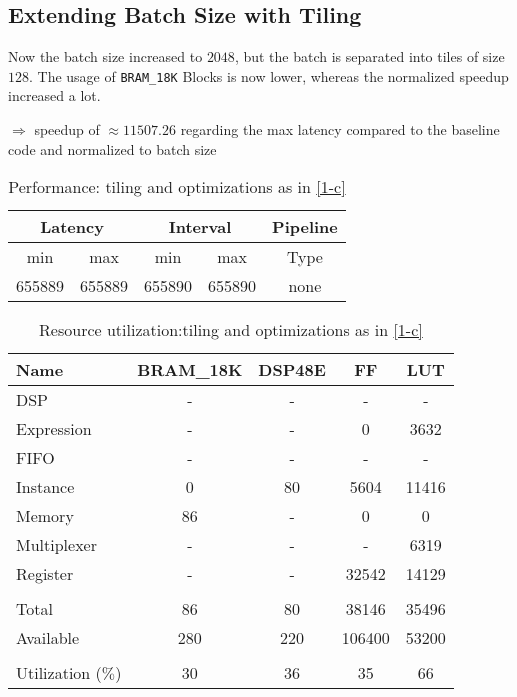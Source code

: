 \documentclass[../main.tex]{subfiles}
\begin{document}
\subsection{Extending Batch Size with Tiling}
	Now the batch size increased to $2048$, but the batch is separated into tiles of size $128$. The usage of \texttt{BRAM\_18K} Blocks is now lower, whereas the normalized speedup increased a lot.

	$\Rightarrow$ speedup of $\approx 11507.26 $ regarding the max latency compared to the baseline code and normalized to batch size
	\begin{table}[H]
		\centering
		\begin{tabular}{ccccc}
			\multicolumn{2}{c}{Latency} & \multicolumn{2}{c}{Interval} & Pipeline\\
			\hline
			min  &   max  &   min  &   max  &   Type  \\
			655889&  655889&  655890&  655890&   none  
		\end{tabular}
		\caption{Performance: tiling and optimizations as in \ref{1-c}}
		\label{1-e-perf-table}
	\end{table}

	\begin{table}[H]
		\centering
		\begin{tabular}{lcccc}
			Name      & BRAM\_18K& DSP48E&   FF   &  LUT  \\
			\hline
			DSP              &        -&      -&       -&      -\\
			Expression       &        -&      -&       0&   3632\\
			FIFO             &        -&      -&       -&      -\\
			Instance         &        0&     80&    5604&  11416\\
			Memory           &       86&      -&       0&      0\\
			Multiplexer      &        -&      -&       -&   6319\\
			Register         &        -&      -&   32542&  14129\\
			\hline                                              \\
			Total            &       86&     80&   38146&  35496\\
			Available        &      280&    220&  106400&  53200\\
			\hline                                              \\
			Utilization ($\%$)  &       30&     36&      35&     66
		\end{tabular}
		\caption{Resource utilization:tiling and optimizations as in \ref{1-c}}
		\label{1-e-resources}
	\end{table}
\end{document}
